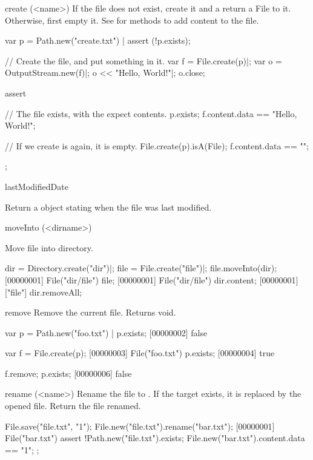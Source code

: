 \begin{urbiscriptapi}
\item[create](<name>)%
  If the file  does not exist, create it and a return a File to
  it.  Otherwise, first empty it.  See  for methods
  to add content to the file.
\begin{urbiscript}
var p = Path.new("create.txt") |
assert (!p.exists);

// Create the file, and put something in it.
var f = File.create(p)|;
var o = OutputStream.new(f)|;
o << "Hello, World!"|;
o.close;

assert
{
  // The file exists, with the expect contents.
  p.exists;
  f.content.data == "Hello, World!";

  // If we create is again, it is empty.
  File.create(p).isA(File);
  f.content.data == "";
};
\end{urbiscript}

\item[lastModifiedDate]
  \experimental{}

  Return a  object stating when the file was last modified.

\item[moveInto](<dirname>)
  \experimental{}

  Move file into  directory.
\begin{urbiscript}
dir = Directory.create("dir")|;
file = File.create("file")|;
file.moveInto(dir);
[00000001] File("dir/file")
file;
[00000001] File("dir/file")
dir.content;
[00000001] ["file"]
dir.removeAll;
\end{urbiscript}

\item[remove]
  Remove the current file.  Returns void.
\begin{urbiscript}[firstnumber=1]
var p = Path.new("foo.txt") |
p.exists;
[00000002] false

var f = File.create(p);
[00000003] File("foo.txt")
p.exists;
[00000004] true

f.remove;
p.exists;
[00000006] false
\end{urbiscript}

\item[rename](<name>)%
  Rename the file to .  If the target exists, it is replaced by
  the opened file. Return the file renamed.
\begin{urbiscript}
File.save("file.txt", "1\n");
File.new("file.txt").rename("bar.txt");
[00000001] File("bar.txt")
assert
{
  !Path.new("file.txt").exists;
  File.new("bar.txt").content.data == "1\n";
};
\end{urbiscript}


\end{urbiscriptapi}
